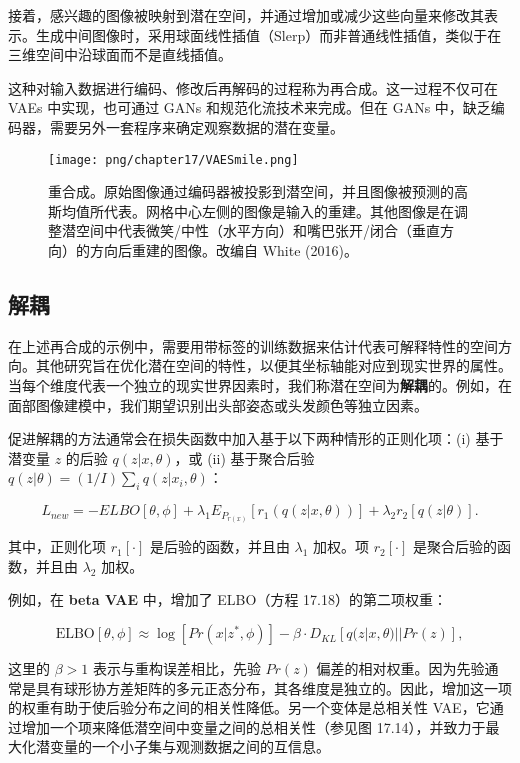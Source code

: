 接着，感兴趣的图像被映射到潜在空间，并通过增加或减少这些向量来修改其表示。生成中间图像时，采用球面线性插值（Slerp）而非普通线性插值，类似于在三维空间中沿球面而不是直线插值。

这种对输入数据进行编码、修改后再解码的过程称为再合成。这一过程不仅可在 VAEs 中实现，也可通过 GANs 和规范化流技术来完成。但在 GANs 中，缺乏编码器，需要另外一套程序来确定观察数据的潜在变量。

\begin{figure}[ht!]
\centering
\texttt{[image: png/chapter17/VAESmile.png]}
\caption{重合成。原始图像通过编码器被投影到潜空间，并且图像被预测的高斯均值所代表。网格中心左侧的图像是输入的重建。其他图像是在调整潜空间中代表微笑/中性（水平方向）和嘴巴张开/闭合（垂直方向）的方向后重建的图像。改编自 White (2016)。}
\end{figure}


\subsection{解耦}
在上述再合成的示例中，需要用带标签的训练数据来估计代表可解释特性的空间方向。其他研究旨在优化潜在空间的特性，以便其坐标轴能对应到现实世界的属性。当每个维度代表一个独立的现实世界因素时，我们称潜在空间为\textbf{解耦}的。例如，在面部图像建模中，我们期望识别出头部姿态或头发颜色等独立因素。

促进解耦的方法通常会在损失函数中加入基于以下两种情形的正则化项：(i) 基于潜变量 \(z\) 的后验 \(q(z|x, \theta)\)，或 (ii) 基于聚合后验 \(q(z|\theta) = (1/I) \sum_i q(z|x_i, \theta)\)：

\begin{equation}
L_{new} = -ELBO[\theta, \phi] + \lambda_1 E_{P_{r(x)}} [r_1(q(z|x, \theta))] + \lambda_2 r_2 [q(z|\theta)]. 
\end{equation}

其中，正则化项 \(r_1[\cdot]\) 是后验的函数，并且由 \(\lambda_1\) 加权。项 \(r_2[\cdot]\) 是聚合后验的函数，并且由 \(\lambda_2\) 加权。

例如，在 \textbf{beta VAE} 中，增加了 ELBO（方程 17.18）的第二项权重：

\begin{equation}
\text{ELBO}[\theta, \phi] \approx \log[Pr(x|z^*, \phi)] - \beta \cdot D_{KL} [q(z|x, \theta) || Pr(z)], 
\end{equation}

这里的 \(\beta > 1\) 表示与重构误差相比，先验 \(Pr(z)\) 偏差的相对权重。因为先验通常是具有球形协方差矩阵的多元正态分布，其各维度是独立的。因此，增加这一项的权重有助于使后验分布之间的相关性降低。另一个变体是总相关性 VAE，它通过增加一个项来降低潜空间中变量之间的总相关性（参见图 17.14），并致力于最大化潜变量的一个小子集与观测数据之间的互信息。

